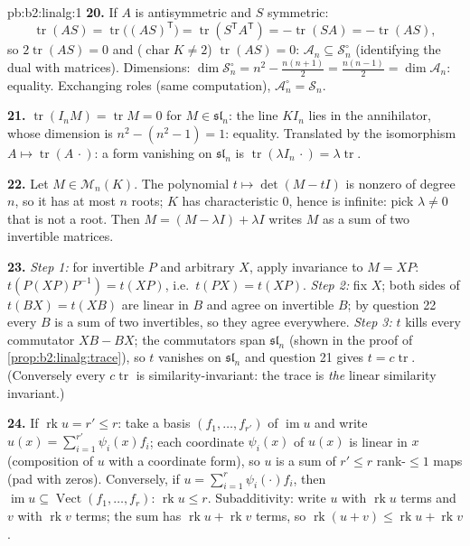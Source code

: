 \begin{solution}{pb:b2:linalg:1}
\textbf{20.} If $A$ is antisymmetric and $S$ symmetric:
\[
\operatorname{tr}(AS) = \operatorname{tr}\bigl((AS)^{\mathsf
T}\bigr) = \operatorname{tr}(S^{\mathsf T}A^{\mathsf T}) =
-\operatorname{tr}(SA) = -\operatorname{tr}(AS),
\]
so $2\operatorname{tr}(AS) = 0$ and ($\operatorname{char} K \neq
2$) $\operatorname{tr}(AS) = 0$: $\mathcal{A}_n \subseteq
\mathcal{S}_n^\circ$ (identifying the dual with matrices).
Dimensions: $\dim\mathcal{S}_n^\circ = n^2 - \frac{n(n+1)}2 =
\frac{n(n-1)}2 = \dim\mathcal{A}_n$: equality. Exchanging roles
(same computation), $\mathcal{A}_n^\circ = \mathcal{S}_n$.

\textbf{21.} $\operatorname{tr}(I_nM) = \operatorname{tr} M = 0$
for $M \in \mathfrak{sl}_n$: the line $KI_n$ lies in the
annihilator, whose dimension is $n^2 - (n^2 - 1) = 1$: equality.
Translated by the isomorphism $A \mapsto
\operatorname{tr}(A\,\cdot)$: a form vanishing on
$\mathfrak{sl}_n$ is $\operatorname{tr}(\lambda I_n\,\cdot) =
\lambda\operatorname{tr}$.

\textbf{22.} Let $M \in \mathcal{M}_n(K)$. The polynomial $t
\mapsto \det(M - tI)$ is nonzero of degree $n$, so it has at most
$n$ roots; $K$ has characteristic $0$, hence is infinite: pick
$\lambda \neq 0$ that is not a root. Then $M = (M - \lambda I) +
\lambda I$ writes $M$ as a sum of two invertible matrices.

\textbf{23.} \emph{Step 1:} for invertible $P$ and arbitrary
$X$, apply invariance to $M = XP$: $t(P(XP)P^{-1}) = t(XP)$,
i.e.\ $t(PX) = t(XP)$. \emph{Step 2:} fix $X$; both sides of
$t(BX) = t(XB)$ are linear in $B$ and agree on invertible $B$;
by question 22 every $B$ is a sum of two invertibles, so they
agree everywhere. \emph{Step 3:} $t$ kills every commutator $XB
- BX$; the commutators span $\mathfrak{sl}_n$ (shown in the
proof of \cref{prop:b2:linalg:trace}), so $t$ vanishes on
$\mathfrak{sl}_n$ and question 21 gives $t =
c\operatorname{tr}$. (Conversely every $c\operatorname{tr}$ is
similarity-invariant: the trace is \emph{the} linear similarity
invariant.)

\textbf{24.} If $\operatorname{rk} u = r' \leq r$: take a basis
$(f_1, \dots, f_{r'})$ of $\operatorname{im} u$ and write $u(x)
= \sum_{i=1}^{r'} \psi_i(x) f_i$; each coordinate $\psi_i(x)$ of
$u(x)$ is linear in $x$ (composition of $u$ with a coordinate
form), so $u$ is a sum of $r' \leq r$ rank-$\leq1$ maps (pad
with zeros). Conversely, if $u = \sum_{i=1}^r \psi_i(\cdot)f_i$,
then $\operatorname{im} u \subseteq \operatorname{Vect}(f_1,
\dots, f_r)$: $\operatorname{rk} u \leq r$. Subadditivity: write
$u$ with $\operatorname{rk} u$ terms and $v$ with
$\operatorname{rk} v$ terms; the sum has $\operatorname{rk} u +
\operatorname{rk} v$ terms, so $\operatorname{rk}(u + v) \leq
\operatorname{rk} u + \operatorname{rk} v$.


\end{solution}
